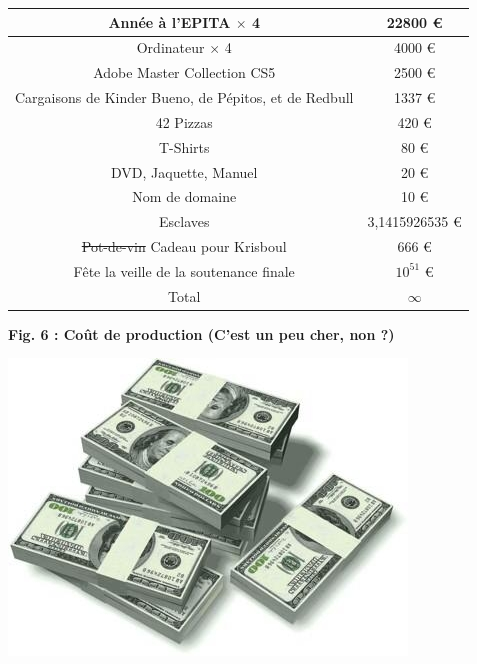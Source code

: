\documentclass{article}
\begin{document}
\begin{center}
\begin{tabular}{|c|c|}
\hline
Année à l'EPITA \(\times\) 4 & 22800 \euro \\
\hline
Ordinateur \(\times\) 4 & 4000 \euro \\
\hline
Adobe Master Collection CS5 & 2500 \euro \\
\hline
Cargaisons de Kinder Bueno, de Pépitos, et de Redbull  & 1337 \euro \\
\hline
42 Pizzas & 420 \euro \\
\hline
T-Shirts & 80 \euro \\
\hline
DVD, Jaquette, Manuel & 20 \euro \\
\hline
Nom de domaine & 10 \euro \\
\hline
Esclaves & 3,1415926535 \euro \\
\hline
\st{Pot-de-vin} Cadeau pour Krisboul & 666 \euro \\
\hline
Fête la veille de la soutenance finale & $10^{51}$ \euro \\
\hline
Total & \(\infty\)  \\
\hline
\end{tabular}
\end{center}

\begin{center}
\bf{Fig. 6 : Coût de production (C'est un peu cher, non ?)}
\end{center}

\vspace*{2cm}

\begin{center}
\includegraphics[scale=0.5]{Dollars}
\end{center}
\end{document}
